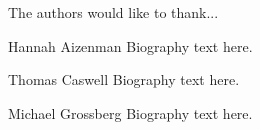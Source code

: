 \documentclass[10pt,journal,compsoc]{IEEEtran}
\theoremstyle{definition}
\theoremstyle{remark}
\begin{document}
The authors would like to thank...


\ifCLASSOPTIONcaptionsoff
  \newpage
\fi








\begin{IEEEbiographynophoto}{Hannah Aizenman}
Biography text here.
\end{IEEEbiographynophoto}

\begin{IEEEbiographynophoto}{Thomas Caswell}
  Biography text here.
\end{IEEEbiographynophoto}

\begin{IEEEbiographynophoto}{Michael Grossberg}
Biography text here.
\end{IEEEbiographynophoto}




\end{document}
